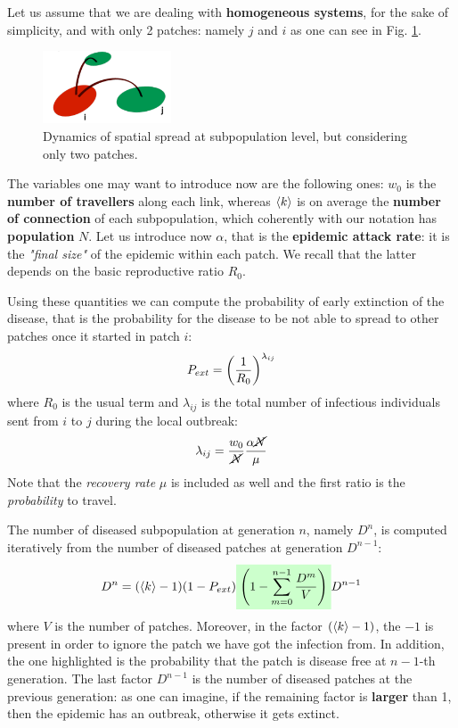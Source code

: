 \documentclass[../main/main.tex]{subfiles}
\begin{document}
Let us assume that we are dealing with \textbf{homogeneous systems}, for the sake of simplicity, and with only 2 patches: namely $j$ and $i$ as one can see in Fig. \ref{fig:16_03}.

\begin{figure}[h!]
\centering
\includegraphics[width=0.34\textwidth]{../lessons/image/16/image03.png}
\caption{\label{fig:16_03} Dynamics of spatial spread at subpopulation level, but considering only two patches.}
\end{figure}

The variables one may want to introduce now are the following ones: $w_0$ is the \textbf{number of travellers} along each link, whereas $\expval{k}$ is on average the \textbf{number of connection} of each subpopulation, which coherently with our notation has \textbf{population} $N$. Let us introduce now $\alpha$, that is the \textbf{epidemic attack rate}: it is the \textit{"final size"} of the epidemic within each patch. We recall that the latter depends on the basic reproductive ratio $R_0$.

Using these quantities we can compute the probability of early extinction of the disease, that is the probability for the disease to be not able to spread to other patches once it started in patch $i$:
\begin{equation}
    P_{ext} = \qty( \frac{1}{R_0} )^{\lambda_{ij}}
\end{equation}
where $R_0$ is the usual term and $\lambda_{ij}$ is the total number of infectious individuals sent from $i$ to $j$ during the local outbreak:
\begin{equation}
    \lambda_{ij} = \frac{w_0}{\cancel{N}} \frac{\alpha \cancel{N}}{\mu}
\end{equation}
Note that the \textit{recovery rate} $\mu$ is included as well and the first ratio is the \textit{probability} to travel.

The number of diseased subpopulation at generation $n$, namely $D^n$, is computed iteratively from the number of diseased patches at generation $D^{n-1}$:
\begin{equation}
    D^n = (\expval{k}-1)(1-P_{ext}) \mathcolorbox{green!20}{\left( 1- \sum_{m=0}^{n-1} \frac{D^m}{V} \right) } D^{n-1}
    \label{eqn:D^n_first}
\end{equation}
where $V$ is the number of patches. Moreover, in the factor $(\expval{k} - 1)$, the $-1$ is present in order to ignore the patch we have got the infection from. In addition, the one highlighted is the probability that the patch is disease free at $n-1$-th generation. The last factor $D^{n-1}$ is the number of diseased patches at the previous generation: as one can imagine, if the remaining factor is \textbf{larger} than 1, then the epidemic has an outbreak, otherwise it gets extinct.
\end{document}
